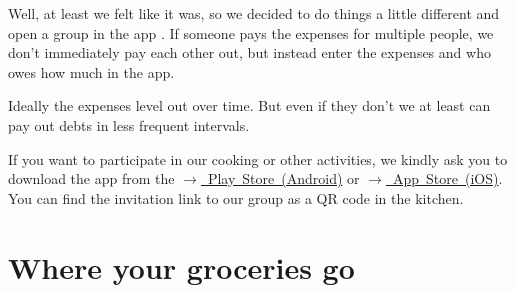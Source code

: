 Well, at least we felt like it was, so we decided to do things a little different and open a group in the app . If someone pays the expenses for multiple people, we don't immediately pay each other out, but instead enter the expenses and who owes how much in the app.

Ideally the expenses level out over time. But even if they don't we at least can pay out debts in less frequent intervals.

If you want to participate in our cooking or other activities, we kindly ask you to download the app from the \mbox{\href{https://play.google.com/store/apps/details?id=com.Splitwise.SplitwiseMobile&hl=de&pli=1}{$\xrightarrow{}$ Play Store (Android)}} or \mbox{\href{https://apps.apple.com/de/app/splitwise/id458023433}{$\xrightarrow{}$ App Store (iOS)}}. You can find the invitation link to our group as a QR code in the kitchen.

\section{Where your groceries go}